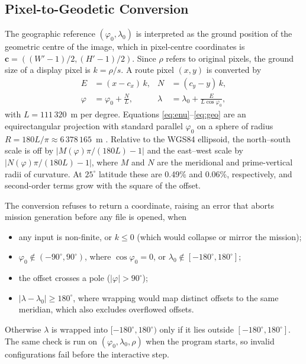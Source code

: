 \subsection{Pixel-to-Geodetic Conversion}
\label{sec:geo}
The geographic reference $(\varphi_0,\lambda_0)$ is interpreted as the ground position of the geometric centre of the image, which in pixel-centre coordinates is $\mathbf c=((W'-1)/2,(H'-1)/2)$. Since $\rho$ refers to original pixels, the ground size of a display pixel is $k=\rho/s$. A route pixel $(x,y)$ is converted by
\begin{align}
E&=(x-c_x)\,k, & N&=(c_y-y)\,k,\label{eq:enu}\\
\varphi&=\varphi_0+\frac{N}{L}, & \lambda&=\lambda_0+\frac{E}{L\cos\varphi_0},\label{eq:geo}
\end{align}
with $L=111\,320$~m per degree. Equations \eqref{eq:enu}--\eqref{eq:geo} are an equirectangular projection with standard parallel $\varphi_0$ on a sphere of radius $R=180L/\pi\approx6\,378\,165$~m \cite{snyder1987map}. Relative to the WGS84 ellipsoid, the north--south scale is off by $|M(\varphi)\pi/(180L)-1|$ and the east--west scale by $|N(\varphi)\pi/(180L)-1|$, where $M$ and $N$ are the meridional and prime-vertical radii of curvature. At $25^\circ$ latitude these are 0.49\% and 0.06\%, respectively, and second-order terms grow with the square of the offset.

The conversion refuses to return a coordinate, raising an error that aborts mission generation before any file is opened, when
\begin{itemize}
\item any input is non-finite, or $k\le0$ (which would collapse or mirror the mission);
\item $\varphi_0\notin(-90^\circ,90^\circ)$, where $\cos\varphi_0=0$, or $\lambda_0\notin[-180^\circ,180^\circ]$;
\item the offset crosses a pole ($|\varphi|>90^\circ$);
\item $|\lambda-\lambda_0|\ge180^\circ$, where wrapping would map distinct offsets to the same meridian, which also excludes overflowed offsets.
\end{itemize}
Otherwise $\lambda$ is wrapped into $[-180^\circ,180^\circ)$ only if it lies outside $[-180^\circ,180^\circ]$. The same check is run on $(\varphi_0,\lambda_0,\rho)$ when the program starts, so invalid configurations fail before the interactive step.

